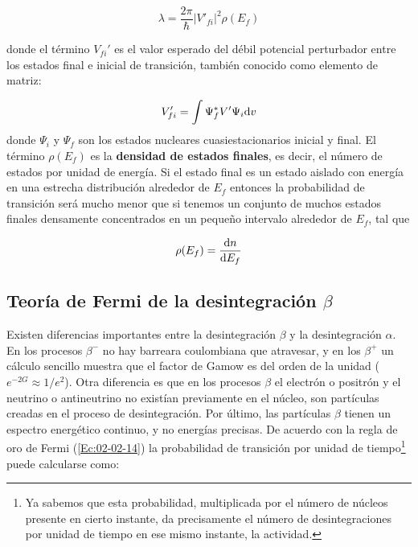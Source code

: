 \begin{mybox}
\begin{equation}
	\lambda = \frac{2\pi}{\hbar} |V'_{fi}|^2 \rho (E_f)	\label{Ec:02-02-14}
\end{equation}
\end{mybox}
donde el término $V_{fi}'$ es el valor esperado del débil potencial perturbador entre los estados final e inicial de transición, también conocido como elemento de matriz:

\begin{equation}
	V_{fi}'= \int \Psi_f^* V' \Psi_i \mathrm{d} v
\end{equation}
donde $\Psi_i$ y $\Psi_f$ son los estados nucleares cuasiestacionarios inicial y final. El término $\rho(E_f)$ es la \textbf{densidad de estados finales}, es decir, el número de estados por unidad de energía. Si el estado final es un estado aislado con energía en una estrecha distribución alrededor de $E_f$ entonces la probabilidad de transición será mucho menor que si tenemos un conjunto de muchos estados finales densamente concentrados en un pequeño intervalo alrededor de $E_f$, tal que

\begin{eqnarray}
	\rho(E_f) = \frac{\mathrm{d} n}{\mathrm{d} E_f}
\end{eqnarray}

\subsection{Teoría de Fermi de la desintegración $\beta$}

Existen diferencias importantes entre la desintegración $\beta$ y la desintegración $\alpha$.  En los procesos $\beta^-$ no hay barreara coulombiana que atravesar, y en los $\beta^+$ un cálculo sencillo muestra que el factor de Gamow es del orden de la unidad ($e^{-2G} \approx 1/e^2$). Otra diferencia es que en los procesos $\beta$ el electrón o positrón y el neutrino o antineutrino no existían previamente en el núcleo, son partículas creadas en el proceso de desintegración. Por último, las partículas $\beta$ tienen un espectro energético continuo, y no energías precisas. De acuerdo con la regla de oro de Fermi (\ref{Ec:02-02-14}) la probabilidad de transición por unidad de tiempo\footnote{Ya sabemos que esta probabilidad, multiplicada por el número de núcleos presente en cierto instante, da precisamente el número de desintegraciones por unidad de tiempo en ese mismo instante, la actividad.} puede calcularse como: 

